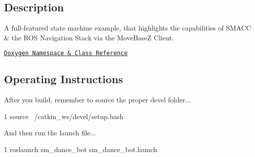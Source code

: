 

\subsection*{Description}

A full-\/featured state machine example, that highlights the capabilities of S\+M\+A\+CC \& the R\+OS Navigation Stack via the Move\+BaseZ Client.~\newline


\href{https://reelrbtx.github.io/SMACC/master/html/namespacesm__dance__bot.html}{\tt Doxygen Namespace \& Class Reference}

\subsection*{Operating Instructions}

After you build, remember to source the proper devel folder...


\begin{DoxyCode}
1 source ~/catkin\_ws/devel/setup.bash
\end{DoxyCode}


And then run the launch file...


\begin{DoxyCode}
1 roslaunch sm\_dance\_bot sm\_dance\_bot.launch
\end{DoxyCode}
 